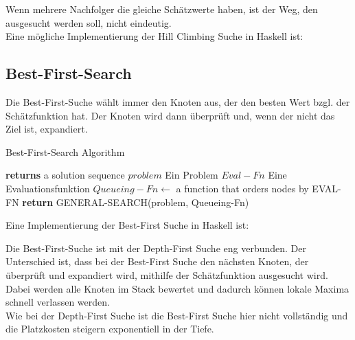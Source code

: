 Wenn mehrere Nachfolger die gleiche Schätzwerte haben, ist der Weg, den ausgesucht werden soll, nicht eindeutig.\\

Eine mögliche Implementierung der Hill Climbing Suche in Haskell ist:\\

\bigskip



\bigskip

\subsection{Best-First-Search}
\bigskip
Die Best-First-Suche wählt immer den Knoten aus, der den besten Wert bzgl. der Schätzfunktion hat. Der Knoten wird dann überprüft und, wenn der nicht das Ziel ist, expandiert.\\


\begin{algorithm}
\caption{Best-First-Search Algorithm}
\begin{algorithmic}[1]
 \State \textbf{returns} a solution sequence
\INPUT
\Statex $problem$ \Comment Ein Problem
\Statex $Eval-Fn$  \Comment Eine Evaluationsfunktion
\State $Queueing-Fn \gets$ a function that orders nodes by EVAL-FN
\State \textbf{return} GENERAL-SEARCH(problem, Queueing-Fn)
\EndFunction
\end{algorithmic}
\end{algorithm}


Eine Implementierung der Best-First Suche in Haskell ist:\\

\newpage



\bigskip

Die Best-First-Suche ist mit der Depth-First Suche eng verbunden. Der Unterschied ist, dass bei der Best-First Suche den nächsten Knoten, der überprüft und expandiert wird, mithilfe der Schätzfunktion ausgesucht wird. Dabei werden alle Knoten im Stack bewertet und dadurch können lokale Maxima schnell verlassen werden.\\

Wie bei der Depth-First Suche ist die Best-First Suche hier nicht vollständig und die Platzkosten steigern exponentiell in der Tiefe.\\

